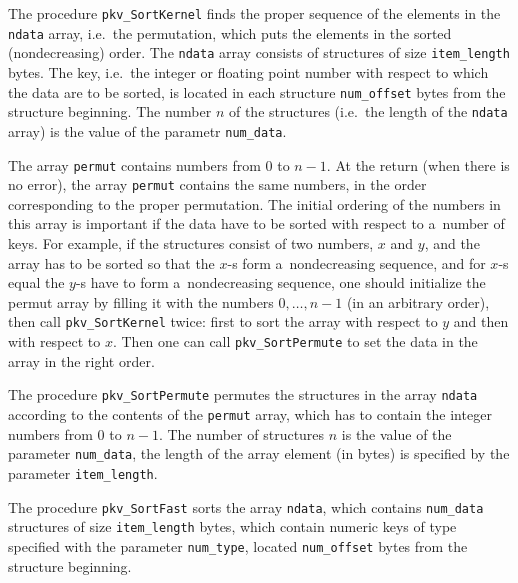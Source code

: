 \vspace{\bigskipamount}
The procedure \texttt{pkv\_SortKernel} finds the proper sequence of the
elements in the \texttt{ndata} array, i.e.\ the permutation, which
puts the elements in the sorted (nondecreasing) order.
The \texttt{ndata} array consists of structures of size \texttt{item\_length}
bytes. The key, i.e.\ the integer or floating point number with respect to
which the data are to be sorted, is located in each structure
\texttt{num\_offset} bytes from the structure beginning. The number $n$
of the structures (i.e.\ the length of the \texttt{ndata} array)
is the value of the parametr \texttt{num\_data}.

The array \texttt{permut} contains numbers from $0$ to $n-1$. At the return
(when there is no error), the array \texttt{permut} contains the same numbers,
in the order corresponding to the proper permutation.
The initial ordering of the numbers in this array is important if the data have
to be sorted with respect to a~number of keys. For example, if the structures
consist of two numbers, $x$ and $y$, and the array has to be sorted so that
the $x$-s form a~nondecreasing sequence, and for $x$-s equal the
$y$-s have to form a~nondecreasing sequence, one should initialize the
permut array by filling it with the numbers $0,\ldots,n-1$ (in an arbitrary
order), then call \texttt{pkv\_SortKernel} twice: first to sort the array
with respect to $y$ and then with respect to $x$. Then one can call
\texttt{pkv\_SortPermute} to set the data in the array in the right order.

\vspace{\bigskipamount}
The procedure \texttt{pkv\_SortPermute} permutes the structures in the array
\texttt{ndata} according to the contents of the \texttt{permut} array,
which has to contain the integer numbers from $0$ to $n-1$. The number of
structures $n$ is the value of the parameter \texttt{num\_data}, the length
of the array element (in bytes) is specified by the parameter
\texttt{item\_length}.

\vspace{\bigskipamount}
The procedure \texttt{pkv\_SortFast} sorts the array \texttt{ndata}, which contains
\texttt{num\_data} structures of size \texttt{item\_length} bytes,
which contain numeric keys of type specified with the parameter
\texttt{num\_type}, located \texttt{num\_offset} bytes from the structure beginning.


